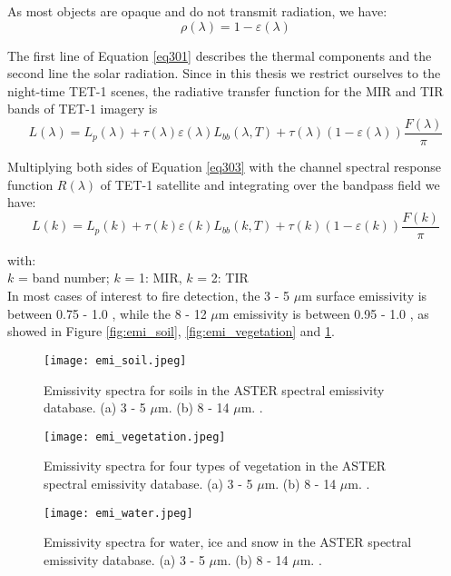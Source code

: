 \noindent As most objects are opaque and do not transmit radiation, we have:
\begin{equation}
\label{eq302}
\rho (\lambda) = 1 - \varepsilon (\lambda)
\end{equation}

\noindent The first line of Equation \eqref{eq301} describes the thermal components and the second line the solar radiation. Since in this thesis we restrict ourselves to the night-time TET-1 scenes, the radiative transfer function for the MIR and TIR bands of TET-1 imagery is
\begin{equation}
\label{eq303}
L(\lambda) = L_p(\lambda) + \tau (\lambda) \varepsilon (\lambda) L_{bb}(\lambda, T) + \tau (\lambda) (1 - \varepsilon (\lambda)) \frac{F(\lambda)}{\pi}
\end{equation}

\noindent Multiplying both sides of Equation \eqref{eq303} with the channel spectral response function $R(\lambda)$ of TET-1 satellite and integrating over the bandpass field we have:
\begin{equation}
\label{eq304}
L(k) = L_p(k) + \tau (k) \varepsilon (k) L_{bb}(k, T) + \tau (k) (1 - \varepsilon (k)) \frac{F(k)}{\pi}
\end{equation}

\noindent with:\\
\indent $k$ = band number; $k$ = 1: MIR, $k$ = 2: TIR\\

\noindent In most cases of interest to fire detection, the 3 - 5 $\mu$m surface emissivity is between 0.75 - 1.0 \parencite{Reference301}, while the 8 - 12 $\mu$m emissivity is between 0.95 - 1.0 \parencite{Reference302}, as showed in Figure \ref{fig:emi_soil}, \ref{fig:emi_vegetation} and \ref{fig:emi_water}.\\

\begin{figure}[!htbp]
  \centering\texttt{[image: emi\_soil.jpeg]}
  \caption{Emissivity spectra for soils in the ASTER spectral emissivity database. (a) 3 - 5 $\mu$m. (b) 8 - 14 $\mu$m. \parencite{Reference303}.}
  \label{fig:emi_soil}
  
  \centering\texttt{[image: emi\_vegetation.jpeg]}
  \caption{Emissivity spectra for four types of vegetation in the ASTER spectral emissivity database. (a) 3 - 5 $\mu$m. (b) 8 - 14 $\mu$m. \parencite{Reference303}.}
  \label{fig:emi_vegetation}
  
  \centering\texttt{[image: emi\_water.jpeg]}
  \caption{Emissivity spectra for water, ice and snow in the ASTER spectral emissivity database. (a) 3 - 5 $\mu$m. (b) 8 - 14 $\mu$m. \parencite{Reference303}.}
  \label{fig:emi_water}
\end{figure}

